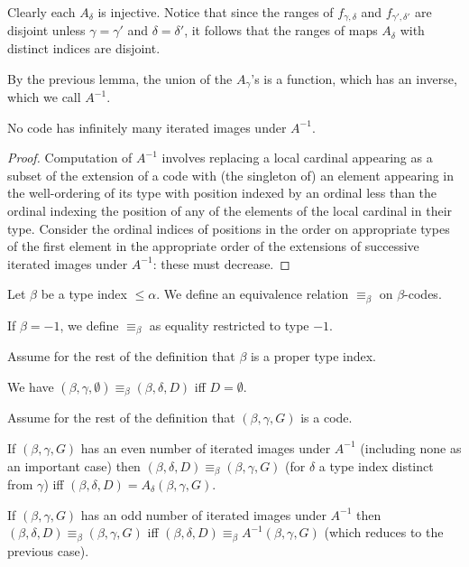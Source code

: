 \begin{lemma}
\label {lem:alt-ext-nature}
Clearly each $A_\delta$ is injective.  Notice that since the ranges of $f_{\gamma,\delta}$ and $f_{\gamma',\delta'}$ are disjoint unless $\gamma=\gamma'$ and $\delta=\delta'$, it follows that the ranges of
maps $A_\delta$ with distinct indices are disjoint.
\end{lemma}

\begin{definition}
\label {def:ainverse}
By the previous lemma, the union of the $A_\gamma$'s is a function, which has an inverse, which we call $A^{-1}$.
\end{definition}

\begin{lemma}
\label {lem:ainverse-stops}
No code has infinitely many iterated images under $A^{-1}$.
\end{lemma}

\begin{proof}
Computation of $A^{-1}$ involves replacing a local cardinal appearing as a subset of the extension of a code
with (the singleton of) an element appearing in the well-ordering of its type with position indexed by an ordinal
less than the ordinal indexing the position of any of the elements of the local cardinal in their type.  Consider the ordinal indices of positions in the order on appropriate types of the first element in the appropriate order of the extensions of successive iterated images under $A^{-1}$:  these must decrease.
\end{proof}

\begin{definition}
\label {def:equiv-code}
Let $\beta$ be a type index $\leq \alpha$.  We define an equivalence relation $\equiv_\beta$ on $\beta$-codes.

If $\beta=-1$, we define $\equiv_\beta$ as equality restricted to type $-1$.

Assume for the rest of the definition that $\beta$ is a proper type index.

We have $(\beta,\gamma,\emptyset) \equiv_\beta (\beta,\delta,D)$ iff $D=\emptyset$.

Assume for the rest of the definition that $(\beta,\gamma,G)$ is a code.

If $(\beta,\gamma,G)$ has an even number of iterated images under $A^{-1}$ (including none as an important case)
then $(\beta,\delta,D) \equiv_\beta (\beta,\gamma,G)$ (for $\delta$ a type index distinct from $\gamma$) iff
$(\beta,\delta,D) = A_{\delta}(\beta,\gamma,G)$.

If $(\beta,\gamma,G)$ has an odd number of iterated images under $A^{-1}$ then $(\beta,\delta,D) \equiv_\beta (\beta,\gamma,G)$ iff $(\beta,\delta,D) \equiv_\beta A^{-1}(\beta,\gamma,G)$ (which reduces to the previous case).
\end{definition}

